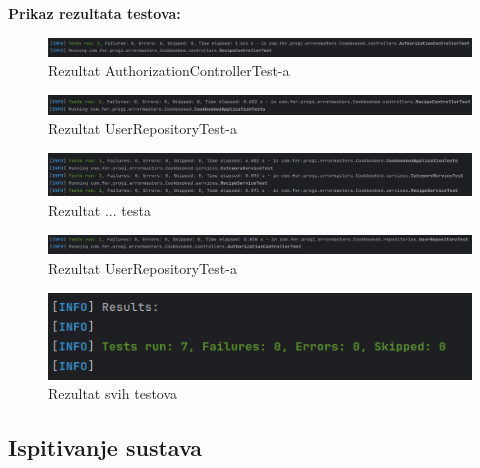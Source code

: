 			\noindent\textbf{Prikaz rezultata testova:}
			\begin{figure}[H]
				\includegraphics[scale=0.38]{slike/test_auth_con_res.png}
				\centering
				\caption{Rezultat AuthorizationControllerTest-a}
				\label{fig:authconres}
			\end{figure}
			\begin{figure}[H]
				\includegraphics[scale=0.4]{slike/test_rec_con_res.png}
				\centering
				\caption{Rezultat UserRepositoryTest-a}
				\label{fig:recconres}
			\end{figure}
			\begin{figure}[H]
				\includegraphics[scale=0.4]{slike/test_three_res.png}
				\centering
				\caption{Rezultat ... testa}
				\label{fig:threeres}
			\end{figure}
			\begin{figure}[H]
				\includegraphics[scale=0.4]{slike/test_user_repo_res.png}
				\centering
				\caption{Rezultat UserRepositoryTest-a}
				\label{fig:userrepores}
			\end{figure}
			\begin{figure}[H]
				\includegraphics[scale=0.4]{slike/test_all_res.png}
				\centering
				\caption{Rezultat svih testova}
				\label{fig:allres}
			\end{figure}
			\eject




			
			\subsection{Ispitivanje sustava}
	
